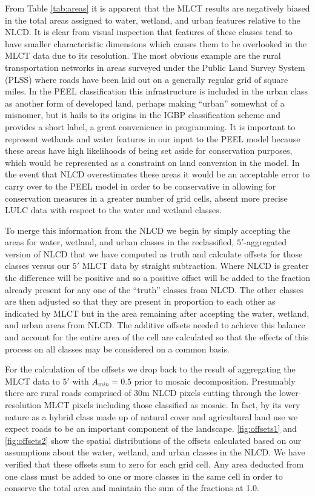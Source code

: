 From Table \ref{tab:areas} it is apparent that the MLCT results are
negatively biased in the total areas assigned to water, wetland, and
urban features relative to the NLCD.  It is clear from visual
inspection that features of these classes tend to have smaller
characteristic dimensions which causes them to be overlooked in the
MLCT data due to its resolution.  The most obvious example are the
rural transportation networks in areas surveyed under the Public Land
Survey System (PLSS) where roads have been laid out on a generally
regular grid of square miles.  In the PEEL classification this
infrastructure is included in the urban class as another form of
developed land, perhaps making ``urban'' somewhat of a misnomer, but
it hails to its origins in the IGBP classification scheme and provides
a short label, a great convenience in programming.  It is important to
represent wetlands and water features in our input to the PEEL model
because these areas have high likelihoods of being set aside for
conservation purposes, which would be represented as a constraint on
land conversion in the model.  In the event that NLCD overestimates
these areas it would be an acceptable error to carry over to the PEEL
model in order to be conservative in allowing for conservation
measures in a greater number of grid cells, absent more precise LULC
data with respect to the water and wetland classes.

To merge this information from the NLCD we begin by simply accepting
the areas for water, wetland, and urban classes in the reclassified,
$5'$-aggregated version of NLCD that we have computed as truth and
calculate offsets for those classes versus our $5'$ MLCT data by
straight subtraction.  Where NLCD is greater the difference will be
positive and so a positive offset will be added to the fraction
already present for any one of the ``truth'' classes from NLCD.  The
other classes are then adjusted so that they are present in proportion
to each other as indicated by MLCT but in the area remaining after
accepting the water, wetland, and urban areas from NLCD.  The additive
offsets needed to achieve this balance and account for the entire area
of the cell are calculated so that the effects of this process on all
classes may be considered on a common basis.  

For the calculation of the offsets we drop back to the result of
aggregating the MLCT data to $5'$ with $A_{min}=0.5$ prior to mosaic
decomposition.  Presumably there are rural roads comprised of 30m NLCD
pixels cutting through the lower-resolution MLCT pixels including
those classified as mosaic.  In fact, by its very nature as a hybrid
class made up of natural cover and agricultural land use we expect
roads to be an important component of the landscape.
\autoref{fig:offsets1} and \autoref{fig:offsets2} show the spatial
distributions of the offsets calculated based on our assumptions about
the water, wetland, and urban classes in the NLCD.  We have verified
that these offsets sum to zero for each grid cell.  Any area deducted
from one class must be added to one or more classes in the same cell
in order to conserve the total area and maintain the sum of the
fractions at 1.0.


